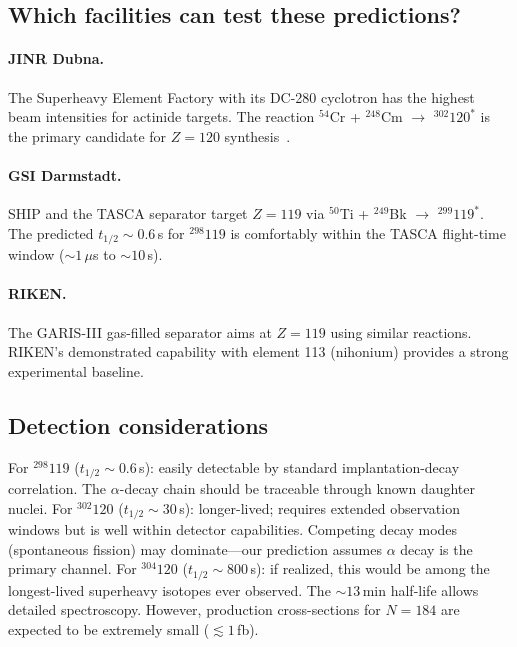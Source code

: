 \documentclass[aps,prc,twocolumn,showpacs,preprintnumbers,amsmath,amssymb]{revtex4-2}
\newcommand{\thalf}{t_{1/2}}
\begin{document}
\subsection{Which facilities can test these predictions?}

\paragraph{JINR Dubna.}
The Superheavy Element Factory with its
DC-280 cyclotron has the highest beam intensities for
actinide targets.  The reaction ${}^{54}$Cr +
${}^{248}$Cm $\to$ ${}^{302}120^*$ is the primary
candidate for $Z = 120$ synthesis~\cite{Oganessian2020}.

\paragraph{GSI Darmstadt.}
SHIP and the TASCA separator target $Z = 119$ via
${}^{50}$Ti + ${}^{249}$Bk $\to$ ${}^{299}119^*$.
The predicted $\thalf \sim 0.6$\,s for ${}^{298}119$
is comfortably within the TASCA flight-time
window ($\sim 1$\,$\mu$s to $\sim 10$\,s).

\paragraph{RIKEN.}
The GARIS-III gas-filled separator aims at $Z = 119$
using similar reactions.  RIKEN's demonstrated
capability with element 113 (nihonium) provides a
strong experimental baseline.

\subsection{Detection considerations}

For ${}^{298}119$ ($\thalf \sim 0.6$\,s): easily
detectable by standard implantation-decay correlation.
The $\alpha$-decay chain should be traceable through
known daughter nuclei.
For ${}^{302}120$ ($\thalf \sim 30$\,s):
longer-lived; requires extended observation windows
but is well within detector capabilities.  Competing
decay modes (spontaneous fission) may dominate---our
prediction assumes $\alpha$ decay is the primary channel.
For ${}^{304}120$ ($\thalf \sim 800$\,s):
if realized, this would be among the longest-lived
superheavy isotopes ever observed.  The $\sim 13$\,min
half-life allows detailed spectroscopy.  However,
production cross-sections for $N = 184$ are expected
to be extremely small ($\lesssim 1$\,fb).
\end{document}
